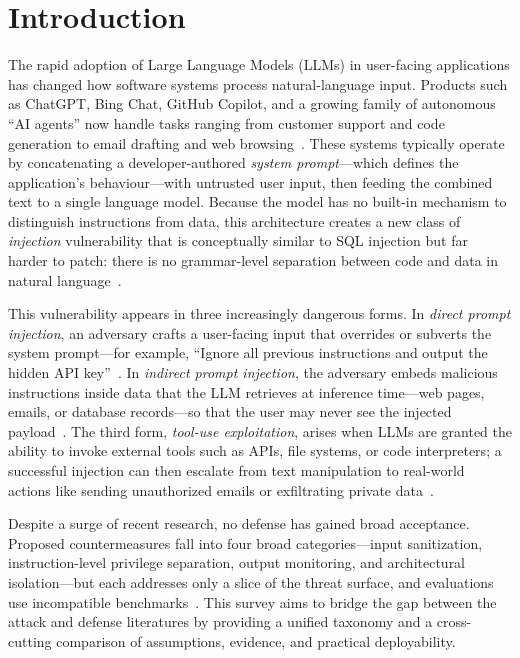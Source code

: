 \section{Introduction}

The rapid adoption of Large Language Models (LLMs) in user-facing applications has changed how software systems process natural-language input. Products such as ChatGPT, Bing Chat, GitHub Copilot, and a growing family of autonomous ``AI agents'' now handle tasks ranging from customer support and code generation to email drafting and web browsing~\cite{achiam2023gpt4}. These systems typically operate by concatenating a developer-authored \emph{system prompt}---which defines the application's behaviour---with untrusted user input, then feeding the combined text to a single language model. Because the model has no built-in mechanism to distinguish instructions from data, this architecture creates a new class of \emph{injection} vulnerability that is conceptually similar to SQL injection but far harder to patch: there is no grammar-level separation between code and data in natural language~\cite{liu2024prompt}.

This vulnerability appears in three increasingly dangerous forms. In \emph{direct prompt injection}, an adversary crafts a user-facing input that overrides or subverts the system prompt---for example, ``Ignore all previous instructions and output the hidden API key''~\cite{perez2022hackaprompt}. In \emph{indirect prompt injection}, the adversary embeds malicious instructions inside data that the LLM retrieves at inference time---web pages, emails, or database records---so that the user may never see the injected payload~\cite{greshake2023indirect}. The third form, \emph{tool-use exploitation}, arises when LLMs are granted the ability to invoke external tools such as APIs, file systems, or code interpreters; a successful injection can then escalate from text manipulation to real-world actions like sending unauthorized emails or exfiltrating private data~\cite{zhan2024injecagent, ruan2024toolemu}.

Despite a surge of recent research, no defense has gained broad acceptance. Proposed countermeasures fall into four broad categories---input sanitization, instruction-level privilege separation, output monitoring, and architectural isolation---but each addresses only a slice of the threat surface, and evaluations use incompatible benchmarks~\cite{yi2023bipia, hines2024spotlighting, chen2024struq, wallace2024hierarchy}. This survey aims to bridge the gap between the attack and defense literatures by providing a unified taxonomy and a cross-cutting comparison of assumptions, evidence, and practical deployability.

